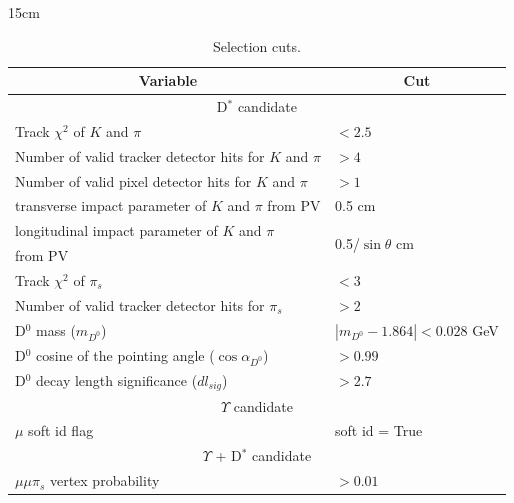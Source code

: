 \begin{table}[!htbp]{15cm}
  \caption{Selection cuts.}
  \begin{tabular}{ l | l }
    \hline
    \multicolumn{1}{c|}{Variable}                             & \multicolumn{1}{|c}{Cut}                  \\ \hline
    \multicolumn{2}{c}{D$^*$ candidate}                                                                   \\ \hline
    Track $\chi^2$ of $K$ and $\pi$                           & $< 2.5$                                   \\ \hline
    Number of valid tracker detector hits for $K$ and $\pi$   & $> 4$                                     \\ \hline
    Number of valid pixel detector hits for $K$ and $\pi$     & $> 1$                                     \\ \hline
    transverse impact parameter of $K$ and $\pi$ from PV      & 0.5 cm                                    \\ \hline
    longitudinal impact parameter of $K$ and $\pi$            & \multirow[c]{2}{*}{0.5/$\sin{\theta}$ cm} \\
    from PV                                                   &                                           \\ \hline
    Track $\chi^2$ of $\pi_s$                                 & $< 3$                                     \\ \hline
    Number of valid tracker detector hits for $\pi_s$         & $> 2$                                     \\ \hline
    D$^0$ mass ($m_{D^0}$)                                    & $|m_{D^0} - 1.864| < 0.028$ GeV           \\ \hline
    D$^0$ cosine of the pointing angle ($\cos{\alpha_{D^0}}$) & $> 0.99$                                  \\ \hline
    D$^0$ decay length significance ($dl_{sig}$)              & $> 2.7$                                   \\ \hline

    \multicolumn{2}{c}{$\Upsilon$ candidate}                                                              \\ \hline
    $\mu$ soft id flag                                        & soft id = True                            \\ \hline

    \multicolumn{2}{c}{$\Upsilon$ + D$^*$ candidate}                                                      \\ \hline
    $\mu\mu\pi_s$ vertex probability                          & $> 0.01$                                  \\ \hline
  \end{tabular}
  \label{tab:selectioncuts}
\end{table}


